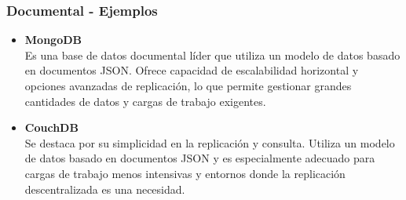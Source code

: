 \begin{frame}
    \frametitle{Documental - Ejemplos}
    \begin{itemize}
        \item \textbf{MongoDB}\\
        Es una base de datos documental líder que utiliza un modelo de datos basado en documentos JSON. Ofrece capacidad de escalabilidad horizontal y opciones avanzadas de replicación, lo que permite gestionar grandes cantidades de datos y cargas de trabajo exigentes.

         

        \item \textbf{CouchDB}\\
        Se destaca por su simplicidad en la replicación y consulta. Utiliza un modelo de datos basado en documentos JSON y es especialmente adecuado para cargas de trabajo menos intensivas y entornos donde la replicación descentralizada es una necesidad.
    \end{itemize}
\end{frame}